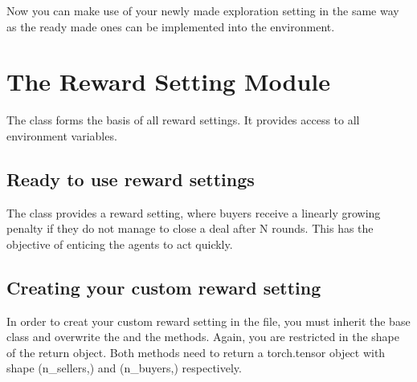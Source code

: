 \documentclass[letterpaper,10pt,english]{sphinxmanual}
\begin{document}
\sphinxAtStartPar
Now you can make use of your newly made exploration setting in the same way as the ready made ones can be implemented
into the environment.


\section{The Reward Setting Module}
\label{\detokenize{MultiAgentMarketRL:the-reward-setting-module}}
\sphinxAtStartPar
The  class forms the basis of all reward settings. It provides access to all environment variables.


\subsection{Ready to use reward settings}
\label{\detokenize{MultiAgentMarketRL:ready-to-use-reward-settings}}
\sphinxAtStartPar
The  class provides a reward setting, where buyers receive a linearly growing penalty if they do
not manage to close a deal after N rounds. This has the objective of enticing the agents to act quickly.


\subsection{Creating your custom reward setting}
\label{\detokenize{MultiAgentMarketRL:creating-your-custom-reward-setting}}
\sphinxAtStartPar
In order to creat your custom reward setting in the  file, you must inherit the 
base class and overwrite the  and the  methods. Again, you are restricted in the
shape of the return object. Both methods need to return a torch.tensor object with shape (n\_sellers,) and (n\_buyers,)
respectively.
\end{document}
